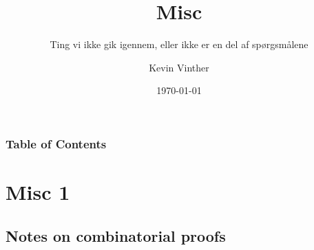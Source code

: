 \documentclass{beamer}
\title{Misc}
\subtitle{Ting vi ikke gik igennem, eller ikke er en del af spørgsmålene}
\author{Kevin Vinther}
\date{\today}
\begin{document}
\begin{frame}
  \titlepage
\end{frame}

\begin{frame}[allowframebreaks]
  \frametitle{Table of Contents}
  \tableofcontents
\end{frame}

\section{Misc 1}
\label{sec:misc1}



\subsection{Notes on combinatorial proofs}
\label{sec:weeklynote2}
\end{document}
